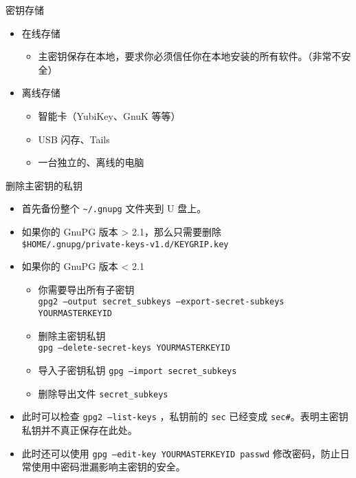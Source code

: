 \documentclass{beamer}
\begin{document}
	\begin{frame}{密钥存储}
		\begin{itemize}[<+->]
			\item 在线存储
			\begin{itemize}
				\item 主密钥保存在本地，要求你必须信任你在本地安装的所有软件。（非常不安全）
			\end{itemize}
			\item 离线存储
				\begin{itemize}
					\item 智能卡（YubiKey、GnuK 等等）
					\item USB 闪存、Tails
					\item 一台独立的、离线的电脑
				\end{itemize}
		\end{itemize}
\end{frame}
	\begin{frame}{删除主密钥的私钥}
		\begin{itemize}[<+->]
			\item 首先备份整个 \texttt{\~{}/.gnupg} 文件夹到 U 盘上。
			\item 如果你的 GnuPG 版本 > 2.1，那么只需要删除\\ \texttt{\$HOME/.gnupg/private-keys-v1.d/KEYGRIP.key}
			\item 如果你的 GnuPG 版本 < 2.1
			\begin{itemize}
				\item 你需要导出所有子密钥\\
				\texttt{gpg2 --output secret\_subkeys --export-secret-subkeys YOURMASTERKEYID}
				\item 删除主密钥私钥 \\
				\texttt{gpg --delete-secret-keys YOURMASTERKEYID}
				\item 导入子密钥私钥
				\texttt{gpg --import secret\_subkeys}
				\item 删除导出文件 \texttt{secret\_subkeys}
			\end{itemize}
		\end{itemize}
	\end{frame}
	\begin{frame}
		\begin{itemize}
			\item 此时可以检查 \texttt{gpg2 --list-keys} ，私钥前的 \texttt{sec} 已经变成 \texttt{sec\#}。表明主密钥私钥并不真正保存在此处。
			\item 此时还可以使用 \texttt{gpg --edit-key YOURMASTERKEYID passwd} 修改密码，防止日常使用中密码泄漏影响主密钥的安全。
		\end{itemize}
\end{frame}
\end{document}
